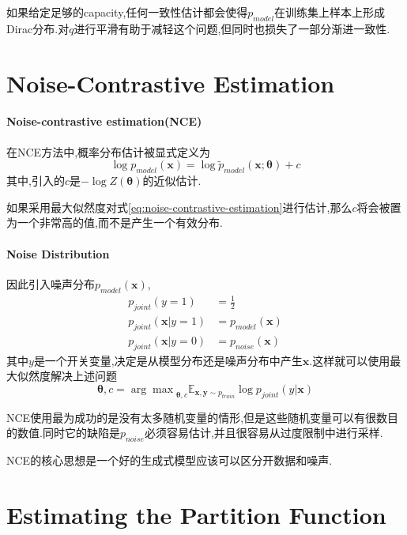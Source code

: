如果给定足够的capacity,任何一致性估计都会使得$p_{model}$在训练集上样本上形成Dirac分布.对$q$进行平滑有助于减轻这个问题,但同时也损失了一部分渐进一致性.

\section{Noise-Contrastive Estimation}

\paragraph{Noise-contrastive estimation(NCE)}在NCE方法中,概率分布估计被显式定义为
\begin{equation}\label{eq:noise-contrastive-estimation}
\log p_{model}(\bm x)=\log\tilde p_{model}(\bm x;\bm\theta)+c
\end{equation}
其中,引入的$c$是$-\log Z(\bm\theta)$的近似估计.

如果采用最大似然度对式\ref{eq:noise-contrastive-estimation}进行估计,那么$c$将会被置为一个非常高的值,而不是产生一个有效分布.

\paragraph{Noise Distribution}因此引入噪声分布$p_{model}(\bm x)$,
\begin{equation}\begin{split}
p_{joint}(y=1)&=\frac{1}{2}\\
p_{joint}(\bm x|y=1)&=p_{model}(\bm x)\\
p_{joint}(\bm x|y=0)&=p_{noise}(\bm x)
\end{split}\end{equation}
其中$y$是一个开关变量,决定是从模型分布还是噪声分布中产生$\bm x$.这样就可以使用最大似然度解决上述问题
\begin{equation}
\bm\theta,c={\arg\max}_{\bm\theta,c}\mathbb E_{\bm{x,y}\sim p_{train}}\log p_{joint}(y|\bm x)
\end{equation}

NCE使用最为成功的是没有太多随机变量的情形,但是这些随机变量可以有很数目的数值.同时它的缺陷是$p_{noise}$必须容易估计,并且很容易从过度限制中进行采样.

NCE的核心思想是一个好的生成式模型应该可以区分开数据和噪声.

\section{Estimating the Partition Function}

